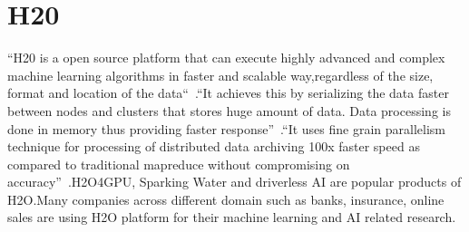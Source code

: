 \section{H20}


``H20 is a open source platform that can execute highly advanced 
and complex machine learning algorithms in faster and scalable 
way,regardless of the size, format and location of the 
data``~\cite{hid-sp18-523-www-h2o}.``It achieves this by serializing 
the data faster between nodes and clusters that stores huge amount 
of data. Data processing is done in memory thus providing faster 
response''~\cite{hid-sp18-523-www-h2o}.``It uses fine grain parallelism 
technique for processing of distributed data archiving 100x faster 
speed as compared to traditional mapreduce without compromising 
on accuracy''~\cite{hid-sp18-523-www-h2o}.H2O4GPU, Sparking Water
and driverless AI are popular products of H2O.Many companies
across different domain such as banks, insurance, online sales 
are using H2O platform for their machine learning and AI related
research.





